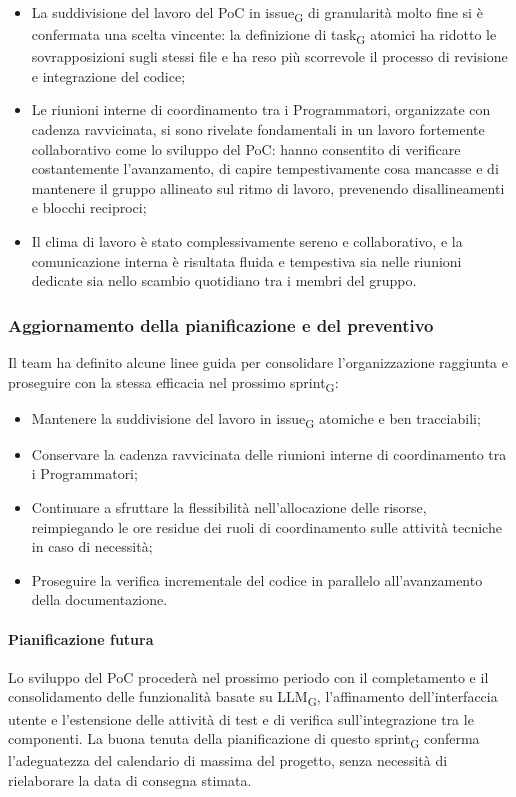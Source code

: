 \documentclass[a4paper, 10pt, colorlinks=true, linkcolor=black, urlcolor=blue, citecolor=blue, hidelinks]{article}
\begin{document}
\begin{itemize}
    \item La suddivisione del lavoro del PoC in issue\textsubscript{G} di granularità molto fine si è confermata una scelta vincente: la definizione di task\textsubscript{G} atomici ha ridotto le sovrapposizioni sugli stessi file e ha reso più scorrevole il processo di revisione e integrazione del codice;
    \item Le riunioni interne di coordinamento tra i Programmatori, organizzate con cadenza ravvicinata, si sono rivelate fondamentali in un lavoro fortemente collaborativo come lo sviluppo del PoC: hanno consentito di verificare costantemente l'avanzamento, di capire tempestivamente cosa mancasse e di mantenere il gruppo allineato sul ritmo di lavoro, prevenendo disallineamenti e blocchi reciproci;
    \item Il clima di lavoro è stato complessivamente sereno e collaborativo, e la comunicazione interna è risultata fluida e tempestiva sia nelle riunioni dedicate sia nello scambio quotidiano tra i membri del gruppo.
\end{itemize}

\subsubsection{Aggiornamento della pianificazione e del preventivo}
Il team ha definito alcune linee guida per consolidare l'organizzazione raggiunta e proseguire con la stessa efficacia nel prossimo sprint\textsubscript{G}:
\begin{itemize}
    \item Mantenere la suddivisione del lavoro in issue\textsubscript{G} atomiche e ben tracciabili;
    \item Conservare la cadenza ravvicinata delle riunioni interne di coordinamento tra i Programmatori;
    \item Continuare a sfruttare la flessibilità nell'allocazione delle risorse, reimpiegando le ore residue dei ruoli di coordinamento sulle attività tecniche in caso di necessità;
    \item Proseguire la verifica incrementale del codice in parallelo all'avanzamento della documentazione.
\end{itemize}

\paragraph{Pianificazione futura}
Lo sviluppo del PoC procederà nel prossimo periodo con il completamento e il consolidamento delle funzionalità basate su LLM\textsubscript{G}, l'affinamento dell'interfaccia utente e l'estensione delle attività di test e di verifica sull'integrazione tra le componenti. La buona tenuta della pianificazione di questo sprint\textsubscript{G} conferma l'adeguatezza del calendario di massima del progetto, senza necessità di rielaborare la data di consegna stimata.
\end{document}
